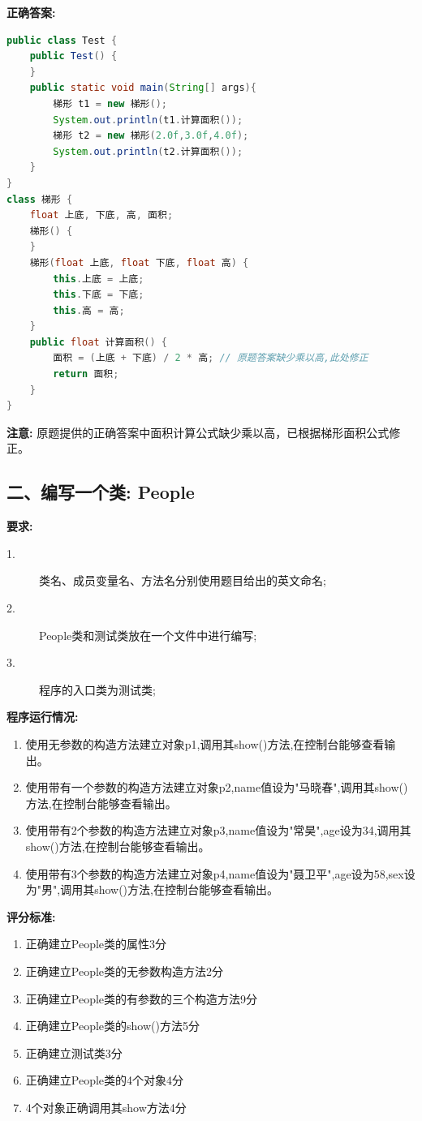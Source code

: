 \documentclass[a4paper,12pt]{article}
\begin{document}
\textbf{正确答案:}

\begin{lstlisting}[language=Java, caption=梯形类与测试]
public class Test {
    public Test() {
    }
    public static void main(String[] args){
        梯形 t1 = new 梯形();
        System.out.println(t1.计算面积());
        梯形 t2 = new 梯形(2.0f,3.0f,4.0f);
        System.out.println(t2.计算面积());
    }
}
class 梯形 {
    float 上底, 下底, 高, 面积;
    梯形() {
    }
    梯形(float 上底, float 下底, float 高) {
        this.上底 = 上底;
        this.下底 = 下底;
        this.高 = 高;
    }
    public float 计算面积() {
        面积 = (上底 + 下底) / 2 * 高; // 原题答案缺少乘以高,此处修正
        return 面积;
    }
}
\end{lstlisting}

\textbf{注意:} 原题提供的正确答案中面积计算公式缺少乘以高，已根据梯形面积公式修正。

\subsection{二、编写一个类: People}

\textbf{要求:}
\begin{description}
	\item[1.] 类名、成员变量名、方法名分别使用题目给出的英文命名;
	\item[2.] People类和测试类放在一个文件中进行编写;
	\item[3.] 程序的入口类为测试类;
\end{description}

\textbf{程序运行情况:}
\begin{enumerate}
	\item 使用无参数的构造方法建立对象p1,调用其show()方法,在控制台能够查看输出。
	\item 使用带有一个参数的构造方法建立对象p2,name值设为"马晓春",调用其show()方法,在控制台能够查看输出。
	\item 使用带有2个参数的构造方法建立对象p3,name值设为"常昊",age设为34,调用其show()方法,在控制台能够查看输出。
	\item 使用带有3个参数的构造方法建立对象p4,name值设为"聂卫平",age设为58,sex设为"男",调用其show()方法,在控制台能够查看输出。
\end{enumerate}

\textbf{评分标准:}
\begin{enumerate}
	\item 正确建立People类的属性3分
	\item 正确建立People类的无参数构造方法2分
	\item 正确建立People类的有参数的三个构造方法9分
	\item 正确建立People类的show()方法5分
	\item 正确建立测试类3分
	\item 正确建立People类的4个对象4分
	\item 4个对象正确调用其show方法4分
\end{enumerate}
\end{document}
